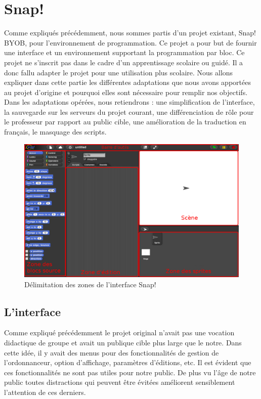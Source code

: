 \section{Snap!}
\label{solution SNAP}
Comme expliqués précédemment, nous sommes partis d'un projet existant, Snap! BYOB, pour l'environnement de programmation. Ce projet a pour but de fournir une interface et un environnement supportant la programmation par bloc. Ce projet ne s'inscrit pas dans le cadre d'un apprentissage scolaire ou guidé. Il a donc fallu adapter le projet pour une utilisation plus scolaire. Nous allons expliquer dans cette partie les différentes adaptations que nous avons apportées au projet d'origine et pourquoi elles sont nécessaire pour remplir nos objectifs.\\

Dans les adaptations opérées, nous retiendrons : une simplification de l'interface, la sauvegarde sur les serveurs du projet courant, une différenciation de rôle pour le professeur par rapport au public cible, une amélioration de la traduction en français, le masquage des scripts.

\begin{figure}[ht]
  \begin{center}
    \includegraphics[scale=0.3]{content/7-solution/2-snap/images/interface}
    \caption{Délimitation des zones de l'interface Snap!}
    \label{fig:snap interface}
  \end{center}
\end{figure}

\subsection{L'interface}
\label{interface}
Comme expliqué précédemment le projet original n'avait pas une vocation didactique de groupe et avait un publique cible plus large que le notre. Dans cette idée, il y avait des menus pour des fonctionnalités de gestion de l'ordonnanceur, option d'affichage, paramètres d'éditions, etc. Il est évident que ces fonctionnalités ne sont pas utiles pour notre public. De plus vu l'âge de notre public toutes distractions qui peuvent être évitées améliorent sensiblement l'attention de ces derniers.

